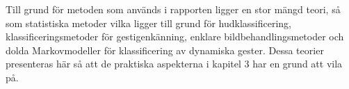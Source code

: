 \documentclass[../rapport_MVEX01-11-05]{subfiles}
\begin{document}
Till grund för metoden som används i rapporten ligger en stor mängd teori, så som
statistiska metoder vilka ligger till grund för hudklassificering,
klassificeringsmetoder för gestigenkänning, enklare bildbehandlingsmetoder
och dolda Markovmodeller för klassificering av dynamiska gester. Dessa teorier
presenteras här så att de praktiska aspekterna i kapitel 3 har en grund att vila på.
\end{document}
